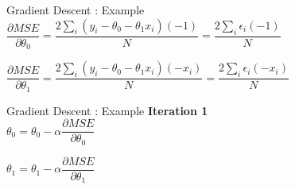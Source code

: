 \documentclass[usenames,dvipsnames]{beamer}
\begin{document}
        \begin{frame}{Gradient Descent : Example}
            $\dfrac{\partial MSE}{\partial \theta_0} = \dfrac{2\sum\limits_i \left( y_i - \theta_0 -\theta_1x_i \right)\left(-1\right)}{N} = \dfrac{2\sum\limits_i \epsilon_i\left(-1\right)}{N}$  
            
            \vspace{2cm}
            $\dfrac{\partial MSE}{\partial \theta_1} = \dfrac{2\sum\limits_i \left( y_i - \theta_0 -\theta_1x_i \right)\left(-x_i\right)}{N} = \dfrac{2\sum\limits_i \epsilon_i\left(-x_i\right)}{N}$ 
            \end{frame}
            
            \begin{frame}{Gradient Descent : Example}
            \textbf{Iteration 1}\\
            \vspace{0.5cm}
            $\theta_0 = \theta_0 - \alpha\dfrac{\partial MSE}{\partial \theta_0}$\\ 
            \vspace{0.5cm}
            
            $\theta_1 = \theta_1 - \alpha\dfrac{\partial MSE}{\partial \theta_1}$\\ 
            \vspace{0.5cm}
            \end{frame}
\end{document}
